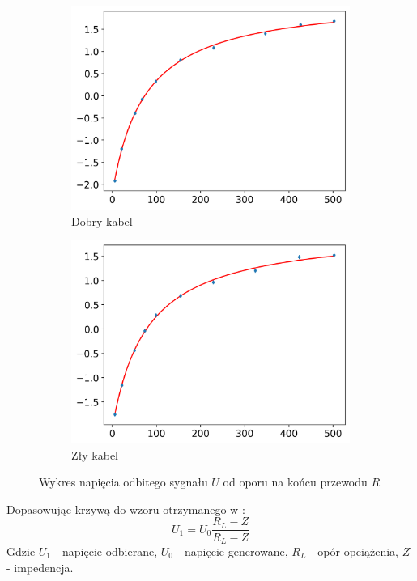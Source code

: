 \documentclass[12pt]{article}
\begin{document}
\begin{figure}[H]
	\centering
	\begin{subfigure}{0.45\textwidth}
		\includegraphics[width=\linewidth]{good_cable_voltage}
		\caption{Dobry kabel}
		\label{fig:good_voltage}
	\end{subfigure}\hfill
	\begin{subfigure}{0.45\textwidth}
		\includegraphics[width=\linewidth]{bad_cable_voltage}
		\caption{Zły kabel}
		\label{fig:bad_voltage}
	\end{subfigure}
	\caption{Wykres napięcia odbitego sygnału \(U\) od oporu na końcu przewodu \(R\)}
	\label{fig:distance}
\end{figure}

Dopasowując krzywą do wzoru otrzymanego w \cite{skrypt}:
\[
	U_1 = U_0 \frac{R_L - Z}{R_L - Z}
\]
Gdzie \(U_1\) - napięcie odbierane, \(U_0\) - napięcie generowane, \(R_L\) - opór opciążenia, \(Z\) - impedencja.
\end{document}
